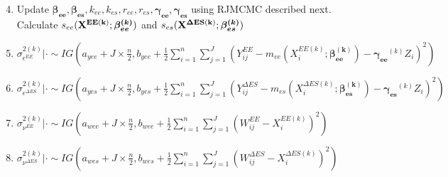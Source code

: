 \documentclass[handout]{beamer}\usepackage[]{graphicx}\usepackage[]{color}
\begin{document}
\begin{frame}

\begin{enumerate}
\setcounter{enumi}{3}
\item
Update ${\boldsymbol{\beta_{ee}},\boldsymbol{\beta_{es}}},k_{ee},k_{es}, {  r_{ee}, r_{es}}, \boldsymbol{\gamma_{ee}^{}}, \boldsymbol{\gamma_{es}^{}}$ using RJMCMC described next. Calculate $s_{ee}({\bf X^{EE(k)}};\boldsymbol{\beta_{ee}^{(k)}})$ and $s_{es}({\bf X^{\Delta ES(k)}};\boldsymbol{\beta_{es}^{(k)}})$ \\

\vspace{0.2cm}

\item
 $\sigma^{2(k)}_{\epsilon^{EE}} |\cdot \sim IG(a_{yee}+J\times \frac{n}{2},b_{yee}+\frac{1}{2}\sum_{i=1}^{n}\sum_{j=1}^{J}(Y_{ij}^{EE}-m_{ee}(X_i^{EE(k)};\boldsymbol{\beta_{ee}^{(k)}})-\boldsymbol{\gamma_{ee}}^{(k)}Z_i)^2)$ \\
 
\vspace{0.2cm}

\item
 $\sigma^{2(k)}_{\epsilon^{\Delta ES}} |\cdot \sim IG(a_{yes}+J\times \frac{n}{2},b_{yes}+\frac{1}{2}\sum_{i=1}^{n}\sum_{j=1}^{J}(Y_{ij}^{\Delta ES}-m_{es}(X_i^{\Delta ES(k)};\boldsymbol{\beta_{es}^{(k)}})-\boldsymbol{\gamma_{es}}^{(k)}Z_i)^2)$ \\
 
 \vspace{0.2cm}
 
\item
 $\sigma^{2(k)}_{\nu^{EE}} |\cdot \sim IG(a_{wee}+J\times \frac{n}{2},b_{wee}+\frac{1}{2}\sum_{i=1}^{n}\sum_{j=1}^{J}(W_{ij}^{EE}-X_i^{EE(k)})^2)$ \\
 
 \vspace{0.2cm}
 
\item
 $\sigma^{2(k)}_{\nu^{\Delta ES}} |\cdot \sim IG(a_{wes}+J\times \frac{n}{2},b_{wes}+\frac{1}{2}\sum_{i=1}^{n}\sum_{j=1}^{J}(W_{ij}^{\Delta ES}-X_i^{\Delta ES(k)})^2)$ \\
 
 \end{enumerate}


\end{frame}
\end{document}
